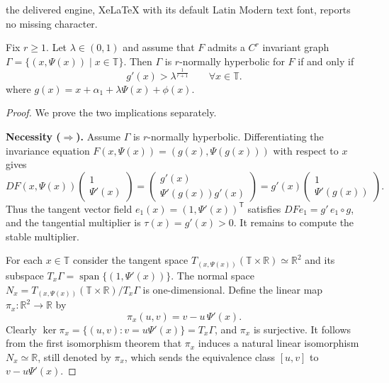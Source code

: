 \documentclass[10pt,a4paper]{amsart}
\begin{document}
the delivered engine, XeLaTeX with its default Latin Modern text font, reports no missing character.
	\begin{Lemma}\label{lem:nh-iff}Fix $r\geq 1$.
		Let $\lambda\in(0,1)$ and assume that
		$F$
		admits a $C^r$ invariant graph $\Gamma=\{(x,\Psi(x))\mid x\in\mathbb{T}\}$.
		Then $\Gamma$ is $r$-normally hyperbolic for $F$ if and only if
		\[
		g'(x)>\lambda^{\frac{1}{r+1}}\qquad\forall x\in\mathbb{T}.
		\]
		where $g(x)=x+\alpha_1+\lambda\Psi(x)+\phi(x)$.
	\end{Lemma}

	\begin{proof}
		We prove the two implications separately.
		
		\noindent\textbf{Necessity ($\Rightarrow$).}
		Assume $\Gamma$ is $r$-normally hyperbolic. Differentiating the invariance equation $F(x,\Psi(x))=(g(x),\Psi(g(x)))$ with respect to $x$ gives
\[
DF(x,\Psi(x))\begin{pmatrix} 1 \\ \Psi'(x) \end{pmatrix}
= \begin{pmatrix} g'(x) \\ \Psi'(g(x))g'(x) \end{pmatrix}
= g'(x)\begin{pmatrix} 1 \\ \Psi'(g(x)) \end{pmatrix}.
\]
Thus the tangent vector field $e_1(x)=(1,\Psi'(x))^{\mathsf{T}}$ satisfies
$DF e_1 = g'\, e_1\circ g$, and the tangential multiplier is $\tau(x)=g'(x)>0$. It remains to compute the stable multiplier.

\medskip

For each $x\in\mathbb{T}$ consider the tangent space $T_{(x,\Psi(x))}(\mathbb{T}\times\mathbb{R}) \simeq \mathbb{R}^2$
and its subspace $T_x\Gamma = \operatorname{span}\{(1,\Psi'(x))\}$.  The normal space
$N_x = T_{(x,\Psi(x))}(\mathbb{T}\times\mathbb{R}) / T_x\Gamma$ is one-dimensional.
Define the linear map $\pi_x: \mathbb{R}^2 \to \mathbb{R}$ by
\[
\pi_x(u,v) = v - u\,\Psi'(x).
\]
Clearly $\ker\pi_x = \{(u,v): v=u\Psi'(x)\} = T_x\Gamma$, and $\pi_x$ is surjective.  It follows from the first isomorphism theorem  that $\pi_x$ induces a natural
linear isomorphism $N_x\simeq\mathbb{R}$, still denoted by $\pi_x$,
which sends the equivalence class $[u,v]$ to $v-u\Psi'(x)$.


\end{proof}
\end{document}
